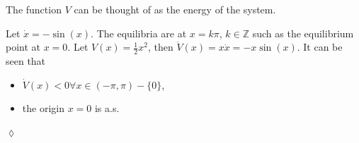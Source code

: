 The function $V$ can be thought of as the energy of the system.

\begin{example}
Let $\dot{x}=-\sin(x)$. The equilibria are at $x=k\pi$, $k\in\mathbb{Z}$ such as the equilibrium point at $x=0$. Let $V(x)=\tfrac{1}{2}x^2$, then $\dot{V}(x)=x\dot{x}=-x\sin(x)$. It can be seen that
\begin{itemize}
\item $\dot{V}(x) < 0 \forall x\in(-\pi,\pi)-\{0\}$,
\item the origin $x=0$ is a.s.
\end{itemize}
$\lozenge$
\end{example}

